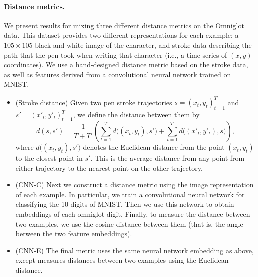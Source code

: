 \paragraph{Distance metrics.} We present results for mixing three different distance metrics on the Omniglot data. This dataset provides two different representations for each example: a $105 \times 105$ black and white image of the character, and stroke data describing the path that the pen took when writing that character (i.e., a time series of $(x,y)$ coordinates). We use a hand-designed distance metric based on the stroke data, as well as features derived from a convolutional neural network trained on MNIST.
%
\begin{itemize}
  \item (Stroke distance) Given two pen stroke trajectories $s = (x_t,
  y_t)_{t=1}^T$ and $s' = (x'_t, y'_t)_{t=1}^T$, we define the distance between
  them by
  \[
    d(s,s') = \frac{1}{T + T'} \left(
      \sum_{t=1}^T d\bigl((x_t, y_t), s'\bigr)
      +
      \sum_{t=1}^{T'} d\bigl((x'_t, y'_t), s\bigr)
    \right),
  \]
  where $d\bigl((x_t, y_t), s'\bigr)$ denotes the Euclidean distance from the
  point $(x_t, y_t)$ to the closest point in $s'$. This is the average distance
  from any point from either trajectory to the nearest point on the other
  trajectory.
  \item (CNN-C) Next we construct a distance metric using the image
  representation of each example. In particular, we train a convolutional neural
  network for classifying the 10 digits of MNIST. Then we use this network to
  obtain embeddings of each omniglot digit. Finally, to measure the distance
  between two examples, we use the cosine-distance between them (that is, the
  angle between the two feature embeddings).
  \item (CNN-E) The final metric uses the same neural network embedding as
  above, except measures distances between two examples using the Euclidean
  distance.
\end{itemize}

